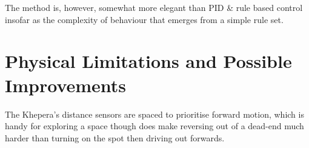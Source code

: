 \documentclass[11pt,a4wide]{article}
\begin{document}
The method is, however, somewhat more elegant than PID \& rule based control insofar 
as the complexity of behaviour that emerges from a simple rule set.


\section{Physical Limitations and Possible Improvements}

The Khepera's distance sensors are spaced to prioritise forward motion, which is handy 
for exploring a space though does make reversing out of a dead-end much harder than 
turning on the spot then driving out forwards.
\end{document}
